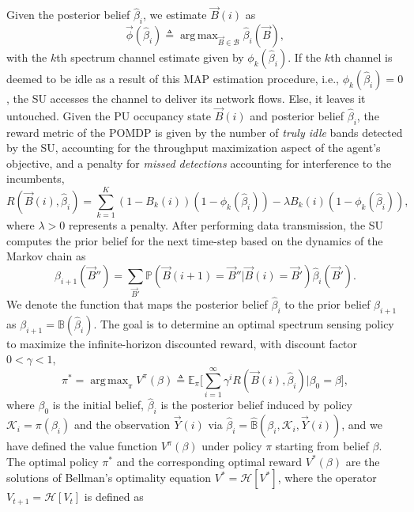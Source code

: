 \documentclass[10pt,twocolumn]{IEEEtran}
\DeclareMathOperator*{\argmax}{arg\,max}
\begin{document}
Given the posterior belief $\hat{\beta}_i$, we estimate $\vec{B}(i)$ as 
$$
\vec{\phi}(\hat{\beta}_{i})\triangleq \argmax_{\vec{B} {\in} \mathcal{B}} \hat{\beta}_{i}(\vec{B}),
$$
with the $k$th spectrum channel estimate given by $\phi_k(\hat{\beta}_{i})$. If the $k$th channel is deemed to be idle as a result of this MAP estimation procedure, i.e., $\phi_{k}(\hat{\beta}_{i}){=}0$, the SU accesses the channel to deliver its network flows. Else, it leaves it untouched. Given the PU occupancy state $\vec{B}(i)$ and posterior belief $\hat\beta_i$, the reward metric of the POMDP is given by the number of \emph{truly idle} bands detected by the SU, accounting for the throughput maximization aspect of the agent's objective, and a penalty for \emph{missed detections} accounting for interference to the incumbents,
\begin{equation}
\nonumber
    R(\vec{B}(i), \hat{\beta}_i){=}\sum_{k=1}^{K} (1{-}B_k(i))(1{-}\phi_k(\hat{\beta}_{i})){-}\lambda B_k(i)(1 - \phi_k(\hat{\beta}_i)),
\end{equation}
where $\lambda{>}0$ represents a penalty. After performing data transmission, the SU computes the prior belief for the next time-step based on the dynamics of the Markov chain as
\begin{equation}\label{13}
    \beta_{i+1}(\vec{B}'')=\sum_{\vec{B}'}\mathbb{P}(\vec{B}(i+1) = \vec{B}''|\vec{B}(i)=\vec{B}')\hat{\beta}_{i}(\vec{B}').
\end{equation}
We denote the function that maps the posterior belief $\hat\beta_i$ to the prior belief $\beta_{i+1}$ as $\beta_{i+1}{=}{\mathbb B}(\hat\beta_i)$.
The goal is to determine an optimal spectrum sensing policy to maximize the infinite-horizon discounted reward, with discount factor $0{<}\gamma{<}1$,
\begin{equation}\label{14}
    \pi^{*}{=}\argmax_{\pi} V^{\pi}(\beta) \triangleq \mathbb{E}_{\pi} \Big[\sum_{i=1}^{\infty} \gamma^{i} R(\vec{B}(i), \hat{\beta}_i)|\beta_0 {=}\beta\Big],
\end{equation}
where $\beta_0$ is the initial belief, $\hat\beta_i$ is the posterior belief induced by policy $\mathcal K_i{=}\pi(\beta_i)$ and the observation $\vec{Y}(i)$ via $\hat\beta_i{=}\hat{\mathbb B}(\beta_i, \mathcal K_i, \vec{Y}(i))$, and we have defined the value function $V^{\pi}(\beta)$ under policy $\pi$ starting from belief $\beta$.
The optimal policy $\pi^*$ and the corresponding optimal reward $V^*(\beta)$ are the solutions of Bellman's optimality equation $V^*{=}\mathcal{H}[V^*]$, where the operator $V_{t+1}{=}\mathcal {H}[V_{t}]$ is defined as
\end{document}
